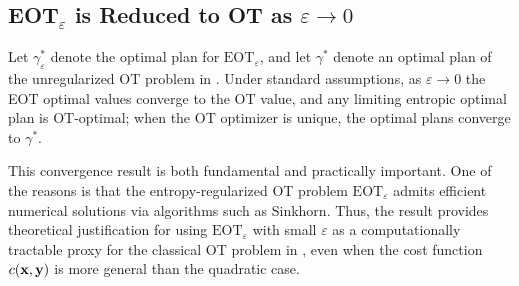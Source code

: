 \subsection{EOT$_\varepsilon$ is Reduced to OT as $\varepsilon\to 0$}\label{subsec:eot-ot}


Let $\gamma^*_\varepsilon$ denote the optimal plan for
$\mathrm{EOT}_\varepsilon$, and let $\gamma^*$ denote an optimal plan of
the unregularized OT problem in . Under standard assumptions,
as $\varepsilon\to0$ the EOT optimal values converge to the OT value, and
any limiting entropic optimal plan is OT-optimal; when the OT optimizer is
unique, the optimal plans converge to $\gamma^*$.



This convergence result is both fundamental and practically important. One of the reasons is that the entropy-regularized OT problem $\mathrm{EOT}_\varepsilon$ admits efficient numerical solutions via algorithms such as Sinkhorn. Thus, the result provides theoretical justification for using $\mathrm{EOT}_\varepsilon$ with small $\varepsilon$ as a computationally tractable proxy for the classical OT problem in , even when the cost function $c({\mathbf{x}}, {\mathbf{y}})$ is more general than the quadratic case.


